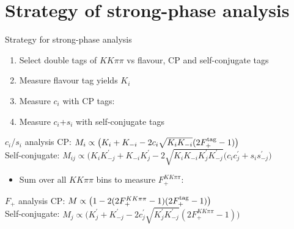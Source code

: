 \documentclass{beamer}
\begin{document}
\section{Strategy of strong-phase analysis}
\begin{frame}{Strategy for strong-phase analysis}
  \begin{enumerate}
    \setlength\itemsep{0.5em}
    \item{Select double tags of $KK\pi\pi$ vs flavour, CP and self-conjugate tags}
    \item{Measure flavour tag yields $K_i$}
    \item{Measure $c_i$ with CP tags:}
    \item{Measure $c_i$+$s_i$ with self-conjugate tags}
  \end{enumerate}
  \begin{block}{$c_i$/$s_i$ analysis}
    CP: $M_i\propto\big(K_i + K_{-i} - 2c_i\sqrt{K_iK_{-i}}(2F_+^{\rm tag} - 1)\big)$ \\
    Self-conjugate: $M_{ij}\propto\big(K_iK_{-j}^\prime + K_{-i}K_j^\prime - 2\sqrt{K_iK_{-i}K_j^\prime K_{-j}^\prime}(c_ic_j^\prime + s_is_{-j}^\prime\big)$
  \end{block}
  \begin{itemize}
    \item{Sum over all $KK\pi\pi$ bins to measure $F_+^{KK\pi\pi}$:}
  \end{itemize}
  \begin{block}{$F_+$ analysis}
    CP: $M\propto\big(1 - 2(2F_+^{KK\pi\pi} - 1)(2F_+^{\rm tag} - 1)\big)$ \\
    Self-conjugate: $M_j\propto\big(K_j^\prime + K_{-j}^\prime - 2c_j^{\prime}\sqrt{K_j^\prime K_{-j}^\prime}(2F_+^{KK\pi\pi} - 1)\big)$
  \end{block}
\end{frame}
\end{document}
